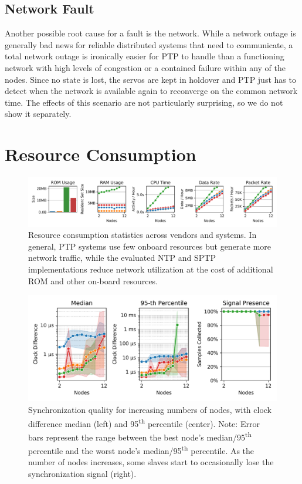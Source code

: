 \subsection{Network Fault}

Another possible root cause for a fault is the network. While a network outage is generally bad news for reliable distributed systems that need to communicate, a total network outage is ironically easier for PTP to handle than a functioning network with high levels of congestion or a contained failure within any of the nodes. Since no state is lost, the servos are kept in holdover and PTP just has to detect when the network is available again to reconverge on the common network time. The effects of this scenario are not particularly surprising, so we do not show it separately.


\section{Resource Consumption}
\label{sec:resource_consumption}

\begin{figure}
\centering
\includegraphics[width=\linewidth]{res/generated/resource_consumption/summary_trend.pdf}
\legend
\caption{Resource consumption statistics across vendors and systems. In general, PTP systems use few onboard resources but generate more network traffic, while the evaluated NTP and SPTP implementations reduce network utilization at the cost of additional ROM and other on-board resources.}
\label{fig:resource_consumption}
\end{figure}

\begin{figure}
\centering
\includegraphics[width=\linewidth]{res/generated/resource_consumption/summary_quality_trend.pdf}
\legend
\caption{Synchronization quality for increasing numbers of nodes, with clock difference median (left) and 95\textsuperscript{th} percentile (center). Note: Error bars represent the range between the best node's median/95\textsuperscript{th} percentile and the worst node's median/95\textsuperscript{th} percentile. As the number of nodes increases, some slaves start to occasionally lose the synchronization signal (right).}
\label{fig:resource_consumption_quality}
\end{figure}


